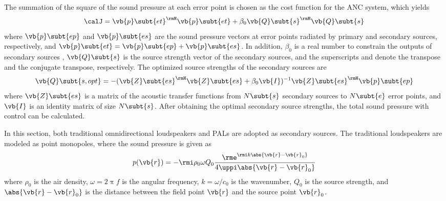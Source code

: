 The summation of the square of the sound pressure at each error point is chosen as the cost function for the ANC system, which yields \cite{Kirkeby1996LocalSoundField, Qiu2019IntroductionVirtualSound}
\begin{equation}
    \calJ  = 
    \vb{p}\subt{et}^\rmH\vb{p}\subt{et}
    +
    \beta_0 \vb{Q}\subt{s}^\rmH \vb{Q}\subt{s}
\end{equation}
where $\vb{p}\subt{ep}$ and $\vb{p}\subt{es}$ are the sound pressure vectors at error points radiated by primary and secondary sources, respectively, and $\vb{p}\subt{et} = \vb{p}\subt{ep} + \vb{p}\subt{es}$. 
In addition, $\beta_0$ is a real number to constrain the outputs of secondary sources \cite{Kirkeby1996LocalSoundField}, $\vb{Q}\subt{s}$ is the source strength vector of the secondary sources, and the superscripts  and  denote the transpose and the conjugate transpose, respectively. 
The optimized source strengths of the secondary sources are \cite{Qiu2019IntroductionVirtualSound}
\begin{equation}
    \vb{Q}\subt{s,opt}
    = 
    -(\vb{Z}\subt{es}^\rmH \vb{Z}\subt{es} + \beta_0 \vb{I} )^{-1}
    \vb{Z}\subt{es}^\rmH
    \vb{p}\subt{ep}
\end{equation}
where $\vb{Z}\subt{es}$ is a matrix of the acoustic transfer functions from $N\subt{s}$ secondary sources to $N\subt{e}$ error points, and $\vb{I}$ is an identity matrix of size $N\subt{s}$. 
After obtaining the optimal secondary source strengths, the total sound pressure with control can be calculated. 

In this section, both traditional omnidirectional loudspeakers and PALs are adopted as secondary sources. 
The traditional loudspeakers are modeled as point monopoles, where the sound pressure is given as
\begin{equation}
    p(\vb{r})
    =-\rmi \rho_0\omega Q_0
    \frac{\rme^{\rmi k \abs{\vb{r}-\vb{r}_0}}}{4\uppi\abs{\vb{r}-\vb{r}_0}}
    \label{eq:ancpal:32980fjs}
\end{equation}
where $\rho_0$ is the air density, $\omega = 2\uppi f$ is the angular frequency, $k = \omega/c_0$ is the wavenumber, $Q_0$ is the source strength, and $\abs{\vb{r}-\vb{r}_0}$ is the distance between the field point $\vb{r}$ and the source point $\vb{r}_0$. 

